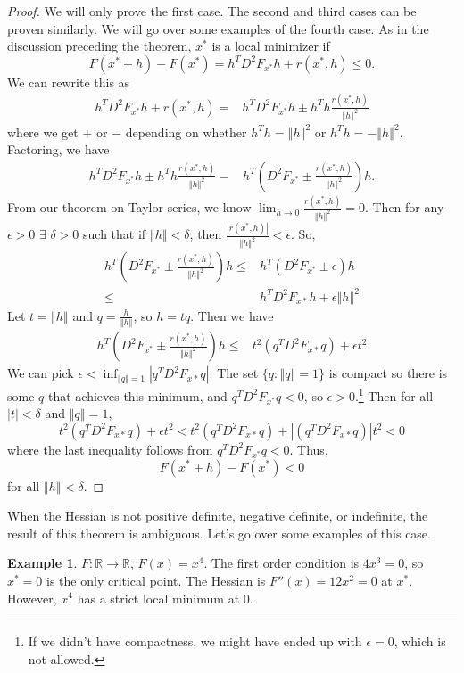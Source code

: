 \documentclass[12pt,reqno]{amsart}
\theoremstyle{definition}
\newtheorem{example}{Example}[section]
\def\R{\mathbb{R}}
\newcommand{\norm}[1]{\left\Vert {#1} \right\Vert}
\renewcommand{\to}{{\rightarrow}}
\begin{document}
\begin{proof}
  We will only prove the first case. The second and third cases can be
  proven similarly. We will go over some examples of the fourth
  case. As in the discussion preceding the theorem, $x^*$ is a local
  minimizer if
  \[ F(x^*+h) - F(x^*) = h^T D^2 F_{x^*} h + r(x^*,h) \leq 0. \]
  We can rewrite this as
  \begin{align*}
    h^T D^2 F_{x^*} h + r(x^*,h) = & h^T D^2 F_{x^*} h \pm h^T h
    \frac{r(x^*,h)}{\norm{h}^2} 
  \end{align*}
  where we get $+$ or $-$ depending on whether $h^T h = \norm{h}^2$ or
  $h^T h = - \norm{h}^2$. Factoring, we have
  \begin{align*}
    h^T D^2 F_{x^*} h \pm h^T h \frac{r(x^*,h)}{\norm{h}^2} = 
    & 
    h^T \left( D^2 F_{x^*}\pm \frac{r(x^*,h)}{\norm{h}^2} \right) h.
  \end{align*}
  From our theorem on Taylor series, we know $\lim_{h \to 0}
  \frac{r(x^*,h)}{\norm{h}^2} = 0$. Then for any $\epsilon > 0$
  $\exists$ $\delta > 0$ such that if $\norm{h} < \delta$, then
  $\frac{|r(x^*,h)|}{\norm{h}^2} < \epsilon$. So,
  \begin{align*}
    h^T \left( D^2 F_{x^*}\pm \frac{r(x^*,h)}{\norm{h}^2} \right) h
    \leq & h^T \left( D^2 F_{x^*}\pm \epsilon \right) h \\
    \leq & h^T D^2 F_{x*} h + \epsilon \norm{h}^2
  \end{align*}
  Let $t = \norm{h}$ and $q = \frac{h}{\norm{h}}$, so $h = t q$. 
  Then we have
   \begin{align*}
    h^T \left( D^2 F_{x^*}\pm \frac{r(x^*,h)}{\norm{h}^2} \right) h
    \leq & t^2 (q^T D^2 F_{x*} q) + \epsilon t^2
  \end{align*}
  We can pick $\epsilon < \inf_{\norm{q} =1} |q^T D^2
  F_{x*} q|$. The set $\{q: \norm{q} = 1\}$ is compact so there is
  some $q$ that achieves this minimum, and $q^T D^2 F_{x^*} q < 0$, so
  $\epsilon >0$.\footnote{If we didn't have compactness, we might have ended
    up with $\epsilon =0$, which is not allowed.} 
  Then for all $|t|<\delta$ and $\norm{q} = 1$, 
  \[ t^2 (q^T D^2 F_{x*} q) + \epsilon t^2 < t^2
  (q^T D^2 F_{x*} q) + |(q^T D^2 F_{x*} q)|t^2 < 0 \]
  where the last inequality follows from $q^T D^2 F_{x^*} q< 0$.
  Thus, 
  \[  F(x^*+h) - F(x^*) < 0 \]
  for all $\norm{h} < \delta$.
\end{proof}

When the Hessian is not positive definite, negative definite, or
indefinite, the result of this theorem is ambiguous. Let's go over
some examples of this case.
\begin{example}
  $F:\R \to \R$, $F(x) = x^4$. The first order condition is $4x^3 =
  0$, so $x^* = 0$ is the only critical point. The Hessian is $F''(x)
  = 12x^2 = 0$ at $x^*$. However, $x^4$ has a strict local minimum at
  $0$.
\end{example}
\end{document}

